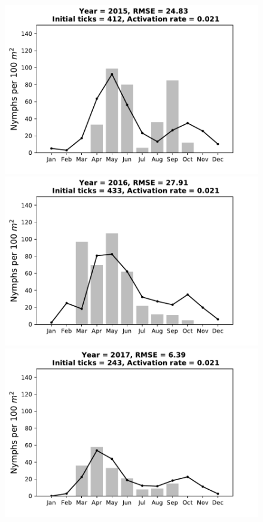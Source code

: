 \documentclass[a4paper, 11pt]{scrartcl}
\begin{document}
\begin{figure}[h!]
\begin{minipage}[c]{0.40\linewidth}
\end{minipage}
\begin{minipage}[c]{0.40\linewidth}
\includegraphics[width=\linewidth]{figures/s2/s2_2015}
\end{minipage}
\begin{minipage}[c]{0.40\linewidth}
\includegraphics[width=\linewidth]{figures/s2/s2_2016}
\end{minipage}
\begin{minipage}[c]{0.40\linewidth}
\includegraphics[width=\linewidth]{figures/s2/s2_2017}

\end{minipage}
\end{figure}
\end{document}
